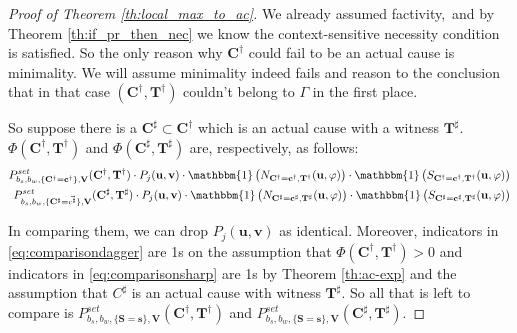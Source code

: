 \documentclass[anon,12pt]{clear2025} %
\begin{document}
\begin{proof}[Proof of Theorem \ref{th:local_max_to_ac}]
We already assumed factivity, and by Theorem \ref{th:if_pr_then_nec} we know the context-sensitive necessity condition is satisfied. So the only reason why $\mathbf{C^\dagger}$ could fail to be an actual cause is minimality. We will assume minimality indeed fails and reason to the conclusion that in that case $(\mathbf{C^\dagger}, \mathbf{T^\dagger})$ couldn't belong to $\Gamma$ in the first place.


So suppose there is a $\mathbf{C^\sharp} \subset \mathbf{C^\dagger}$ which is an actual cause with a witness $\mathbf{T^\sharp}$. $\Phi(\mathbf{C^\dagger}, \mathbf{T^\dagger})$ and $\Phi(\mathbf{C^\sharp}, \mathbf{T^\sharp})$ are, respectively, as follows:
\begin{align}
P^{\mathit{set}}_{b_s,b_w, \{\mathbf{C^\dagger}=\mathbf{c^\dagger}\}, \mathbf{V}}(\mathbf{C^\dagger},\mathbf{T^\dagger}) \cdot P_j(\mathbf{u}, \mathbf{v}) \cdot \mathbbm{1}\left(N_{\mathbf{C^\dagger} = \mathbf{c^\dagger}, \mathbf{T^\dagger}}(\mathbf{u}, \varphi)\right) \cdot \mathbbm{1}\left(S_{\mathbf{C^\dagger} = \mathbf{c^\dagger}, \mathbf{T^\dagger}}(\mathbf{u}, \varphi)\right)  \label{eq:comparisondagger}\\
P^{\mathit{set}}_{b_s,b_w, \{\mathbf{C^\sharp}=\vec {c^\sharp}\}, \mathbf{V}}(\mathbf{C^\sharp},\mathbf{T^\sharp}) \cdot P_j(\mathbf{u}, \mathbf{v}) \cdot \mathbbm{1}\left(N_{\mathbf{C^\sharp} = \mathbf{c^\sharp}, \mathbf{T^\sharp}}(\mathbf{u}, \varphi)\right) \cdot \mathbbm{1}\left(S_{\mathbf{C^\sharp} = \mathbf{c^\sharp}, \mathbf{T^\sharp}}(\mathbf{u}, \varphi)\right) \label{eq:comparisonsharp}
\end{align}

\noindent In comparing them, we can drop  $P_j(\mathbf{u}, \mathbf{v})$ as identical. Moreover, indicators in \eqref{eq:comparisondagger} are 1s on the assumption that $\Phi(\mathbf{C^\dagger}, \mathbf{T^\dagger})>0$ and indicators in \eqref{eq:comparisonsharp} are 1s by Theorem \ref{th:ac-exp} and the assumption that $C^\sharp$ is an actual cause with witness $\mathbf{T^\sharp}$.  So all that is left to compare is $P^{\mathit{set}}_{b_s,b_w, \{\mathbf{S}=\mathbf{s}\}, \mathbf{V}}(\mathbf{C^\dagger},\mathbf{T^\dagger})$ and  $P^{\mathit{set}}_{b_s,b_w, \{\mathbf{S}=\mathbf{s}\}, \mathbf{V}}(\mathbf{C^\sharp},\mathbf{T^\sharp})$.


\end{proof}
\end{document}
